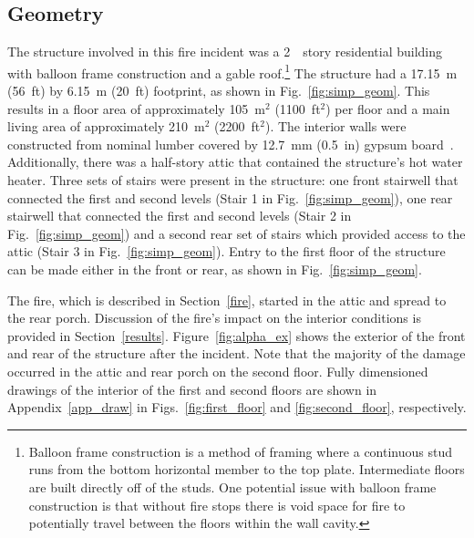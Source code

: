 \subsection{Geometry}
\label{geom}
The structure involved in this fire incident was a 2~~story residential building with balloon frame construction and a gable roof.\footnote{Balloon frame construction is a method of framing where a continuous stud runs from the bottom horizontal member to the top plate. Intermediate floors are built directly off of the studs. One potential issue with balloon frame construction is that without fire stops there is void space for fire to potentially travel between the floors within the wall cavity.} The structure had a 17.15~m (56~ft) by 6.15~m (20~ft) footprint, as shown in Fig.~\ref{fig:simp_geom}. This results in a floor area of approximately 105~m$^2$ (1100~ft$^2$) per floor and a main living area of approximately 210~m$^2$ (2200~ft$^2$). The interior walls were constructed from nominal lumber covered by 12.7~mm (0.5~in) gypsum board~\cite{NIOSH:Bowyer}. Additionally, there was a half-story attic that contained the structure's hot water heater. Three sets of stairs were present in the structure: one front stairwell that connected the first and second levels (Stair 1 in Fig.~\ref{fig:simp_geom}), one rear stairwell that connected the first and second levels (Stair 2 in Fig.~\ref{fig:simp_geom}) and a second rear set of stairs which provided access to the attic (Stair 3 in Fig.~\ref{fig:simp_geom}). Entry to the first floor of the structure can be made either in the front or rear, as shown in Fig.~\ref{fig:simp_geom}.

The fire, which is described in Section~\ref{fire}, started in the attic and spread to the rear porch. Discussion of the fire's impact on the interior conditions is provided in Section~\ref{results}. Figure~\ref{fig:alpha_ex} shows the exterior of the front and rear of the structure after the incident. Note that the majority of the damage occurred in the attic and rear porch on the second floor. Fully dimensioned drawings of the interior of the first and second floors are shown in Appendix~\ref{app_draw} in Figs.~\ref{fig:first_floor} and \ref{fig:second_floor}, respectively.

